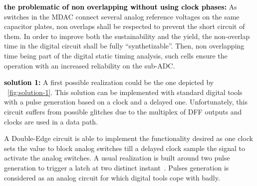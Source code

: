 \textbf{\textcolor{black}{the problematic of non overlapping without using clock phases:}}
As switches in the MDAC connect several analog reference voltages on the same capacitor plates, non overlaps shall be respected to prevent the short circuit of them. In order to improve both the sustainability and the yield, the non-overlap time in the digital circuit shall be fully ``synthetizable''. Then, non overlapping time being part of the digital static timing analysis, such cells ensure the operation with an increased reliability on the sub-ADC\@.

\textbf{\textcolor{black}{solution 1:}}
A first possible realization could be the one depicted by \figurename~\ref{fig:solution-1}. This solution can be implemented with standard digital tools with a pulse generation based on a clock and a delayed one. Unfortunately, this circuit suffers from possible glitches due to the multiplex of DFF outputs and clocks are used in a data path.

A Double-Edge circuit is able to implement the functionality desired as one clock sets the value to block analog switches till a delayed clock sample the signal to activate the analog switches. A usual realization is built around two pulse generation to trigger a latch at two distinct instant~\cite{Afghahi1996, Cheng2003dig, Murotiya2013, Bonetti2015}. Pulses generation is considered as an analog circuit for which digital tools cope with badly.

